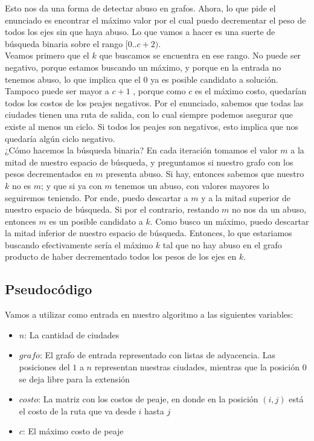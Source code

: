 Esto nos da una forma de detectar abuso en grafos. Ahora, lo que pide el enunciado es encontrar el máximo valor por el cual puedo decrementar el peso de todos los ejes sin que haya abuso. Lo que vamos a hacer es una suerte de búsqueda binaria sobre el rango $[0..c+2)$. \\

Veamos primero que el $k$ que buscamos se encuentra en ese rango. No puede ser negativo, porque estamos buscando un máximo, y porque en la entrada no tenemos abuso, lo que implica que el $0$ ya es posible candidato a solución. Tampoco puede ser mayor a $c+1$ , porque como $c$ es el máximo costo, quedarían todos los costos de los peajes negativos. Por el enunciado, sabemos que todas las ciudades tienen una ruta de salida, con lo cual siempre podemos asegurar que existe al menos un ciclo. Si todos los peajes son negativos, esto implica que nos quedaría algún ciclo negativo. \\

¿Cómo hacemos la búsqueda binaria? En cada iteración tomamos el valor $m$ a la mitad de nuestro espacio de búsqueda, y preguntamos si nuestro grafo con los pesos decrementados en $m$ presenta abuso. Si hay, entonces sabemos que nuestro $k$ no es $m$; y que si ya con $m$ tenemos un abuso, con valores mayores lo seguiremos teniendo. Por ende, puedo descartar a $m$ y a la mitad superior de nuestro espacio de búsqueda. Si por el contrario, restando $m$ no nos da un abuso, entonces $m$ es un posible candidato a $k$. Como busco un máximo, puedo descartar la mitad inferior de nuestro espacio de búsqueda. Entonces, lo que estariamos buscando efectivamente sería el máximo $k$ tal que no hay abuso en el grafo producto de haber decrementado todos los pesos de los ejes en $k$. \\

\newpage
\subsection{Pseudocódigo}

Vamos a utilizar como entrada en nuestro algoritmo a las siguientes variables:
\begin{itemize}
	\item $n$: La cantidad de ciudades
	\item $grafo$: El grafo de entrada representado con listas de adyacencia. Las posiciones del $1$ a $n$ representan nuestras ciudades, mientras que la posición $0$ se deja libre para la extensión
	\item $costo$: La matriz con los costos de peaje, en donde en la posición $(i,j)$ está el costo de la ruta que va desde $i$ hasta $j$
	\item $c$: El máximo costo de peaje
\end{itemize}


